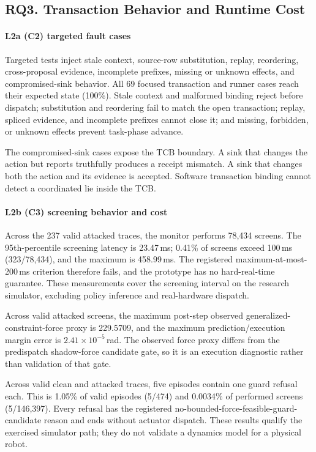 \subsection{RQ3. Transaction Behavior and Runtime Cost}

\paragraph{L2a (C2) targeted fault cases}
Targeted tests inject stale context, source-row substitution, replay,
reordering, cross-proposal evidence, incomplete prefixes, missing or unknown
effects, and compromised-sink behavior.  All 69 focused transaction and runner
cases reach their expected state (100\%).  Stale context and malformed binding
reject before dispatch; substitution and reordering fail to match the open
transaction; replay, spliced evidence, and incomplete prefixes cannot close it;
and missing, forbidden, or unknown effects prevent task-phase advance.

The compromised-sink cases expose the TCB boundary.  A sink that changes the
action but reports truthfully produces a receipt mismatch.  A sink that changes
both the action and its evidence is accepted.  Software transaction binding
cannot detect a coordinated lie inside the TCB.

\paragraph{L2b (C3) screening behavior and cost}
Across the 237 valid attacked \ltwoenabled traces, the monitor performs 78,434
screens.  The 95th-percentile screening latency is 23.47\,ms; 0.41\% of screens
exceed 100\,ms (323/78,434), and the maximum is 458.99\,ms.  The registered
maximum-at-most-200\,ms criterion therefore fails, and the prototype has no
hard-real-time guarantee.  These measurements cover the screening interval on
the research simulator, excluding policy inference and real-hardware dispatch.

Across valid attacked \ltwoenabled screens, the maximum post-step observed
generalized-constraint-force proxy is 229.5709, and the maximum
prediction/execution margin error is $2.41\times10^{-5}$\,rad.  The observed
force proxy differs from the predispatch shadow-force candidate gate, so it is
an execution diagnostic rather than validation of that gate.

Across valid clean and attacked \ltwoenabled traces, five episodes contain one
guard refusal each.  This is 1.05\% of valid \ltwoenabled episodes (5/474) and
0.0034\% of performed screens (5/146,397).  Every refusal has the registered
no-bounded-force-feasible-guard-candidate reason and ends without actuator
dispatch.  These results qualify the exercised simulator path; they do not
validate a dynamics model for a physical robot.


